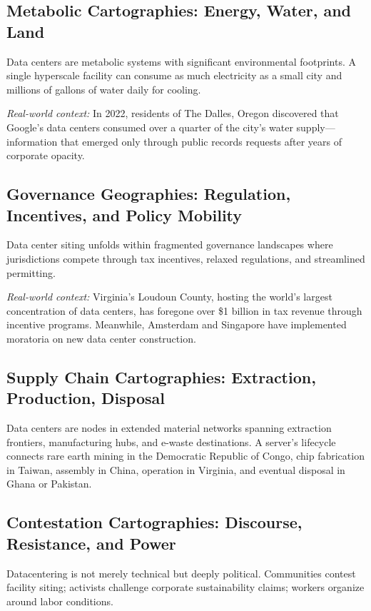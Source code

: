 \documentclass[../../main.tex]{subfiles}
\begin{document}
\subsection{Metabolic Cartographies: Energy, Water, and Land}

Data centers are metabolic systems with significant environmental footprints. A single hyperscale facility can consume as much electricity as a small city and millions of gallons of water daily for cooling.

\textit{Real-world context:} In 2022, residents of The Dalles, Oregon discovered that Google's data centers consumed over a quarter of the city's water supply---information that emerged only through public records requests after years of corporate opacity.

\subsection{Governance Geographies: Regulation, Incentives, and Policy Mobility}

Data center siting unfolds within fragmented governance landscapes where jurisdictions compete through tax incentives, relaxed regulations, and streamlined permitting.

\textit{Real-world context:} Virginia's Loudoun County, hosting the world's largest concentration of data centers, has foregone over \$1 billion in tax revenue through incentive programs. Meanwhile, Amsterdam and Singapore have implemented moratoria on new data center construction.

\subsection{Supply Chain Cartographies: Extraction, Production, Disposal}

Data centers are nodes in extended material networks spanning extraction frontiers, manufacturing hubs, and e-waste destinations. A server's lifecycle connects rare earth mining in the Democratic Republic of Congo, chip fabrication in Taiwan, assembly in China, operation in Virginia, and eventual disposal in Ghana or Pakistan.

\subsection{Contestation Cartographies: Discourse, Resistance, and Power}

Datacentering is not merely technical but deeply political. Communities contest facility siting; activists challenge corporate sustainability claims; workers organize around labor conditions.
\end{document}
